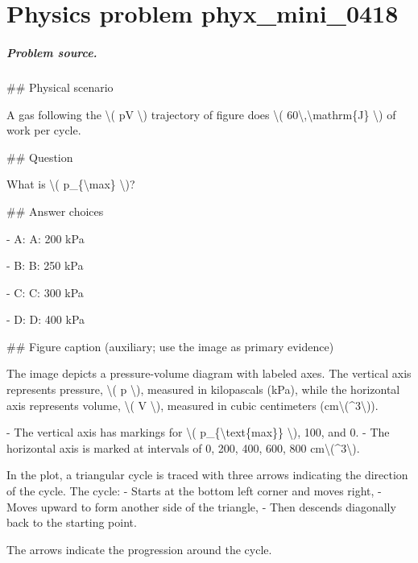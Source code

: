 
\chapter{Physics problem phyx\_mini\_0418}
\label{ch:PhyXMiniProblems_problem_phyx_mini_0418}

\paragraph{Problem source.}
\#\# Physical scenario

A gas following the \textbackslash{}( pV \textbackslash{}) trajectory of figure does \textbackslash{}( 60\textbackslash{},\textbackslash{}mathrm\{J\} \textbackslash{}) of work per cycle.

\#\# Question

What is \textbackslash{}( p\_\{\textbackslash{}max\} \textbackslash{})?

\#\# Answer choices

- A: A: 200 kPa

- B: B: 250 kPa

- C: C: 300 kPa

- D: D: 400 kPa

\#\# Figure caption (auxiliary; use the image as primary evidence)

The image depicts a pressure-volume diagram with labeled axes. The vertical axis represents pressure, \textbackslash{}( p \textbackslash{}), measured in kilopascals (kPa), while the horizontal axis represents volume, \textbackslash{}( V \textbackslash{}), measured in cubic centimeters (cm\textbackslash{}(\textasciicircum{}3\textbackslash{})).

- The vertical axis has markings for \textbackslash{}( p\_\{\textbackslash{}text\{max\}\} \textbackslash{}), 100, and 0.
- The horizontal axis is marked at intervals of 0, 200, 400, 600, 800 cm\textbackslash{}(\textasciicircum{}3\textbackslash{}).

In the plot, a triangular cycle is traced with three arrows indicating the direction of the cycle. The cycle:
- Starts at the bottom left corner and moves right,
- Moves upward to form another side of the triangle,
- Then descends diagonally back to the starting point.

The arrows indicate the progression around the cycle.

